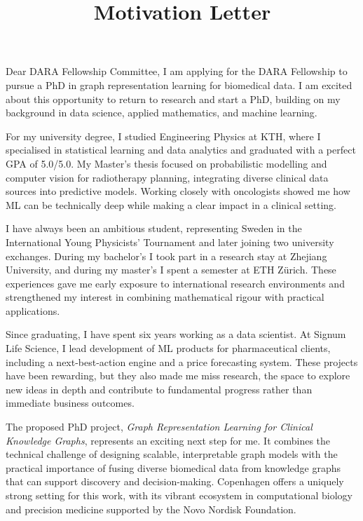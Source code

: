 \documentclass[11pt,a4paper]{moderncv}
\title{Motivation Letter}
\begin{document}
\makecvtitle
Dear DARA Fellowship Committee, I am applying for the DARA Fellowship to pursue a PhD in graph representation learning for biomedical data. I am excited about this opportunity to return to research and start a PhD, building on my background in data science, applied mathematics, and machine learning.

\hspace*{2em}
For my university degree, I studied Engineering Physics at KTH, where I specialised in statistical learning and data analytics and graduated with a perfect GPA of 5.0/5.0. My Master's thesis focused on probabilistic modelling and computer vision for radiotherapy planning, integrating diverse clinical data sources into predictive models. Working closely with oncologists showed me how ML can be technically deep while making a clear impact in a clinical setting.

\hspace*{2em}
I have always been an ambitious student, representing Sweden in the International Young Physicists' Tournament and later joining two university exchanges. During my bachelor's I took part in a research stay at Zhejiang University, and during my master's I spent a semester at ETH Zürich. These experiences gave me early exposure to international research environments and strengthened my interest in combining mathematical rigour with practical applications.

\hspace*{2em}
Since graduating, I have spent six years working as a data scientist. At Signum Life Science, I lead development of ML products for pharmaceutical clients, including a next-best-action engine and a price forecasting system. These projects have been rewarding, but they also made me miss research, the space to explore new ideas in depth and contribute to fundamental progress rather than immediate business outcomes.

\hspace*{2em}
The proposed PhD project, \textit{Graph Representation Learning for Clinical Knowledge Graphs}, represents an exciting next step for me. It combines the technical challenge of designing scalable, interpretable graph models with the practical importance of fusing diverse biomedical data from knowledge graphs that can support discovery and decision-making. Copenhagen offers a uniquely strong setting for this work, with its vibrant ecosystem in computational biology and precision medicine supported by the Novo Nordisk Foundation.
\end{document}
